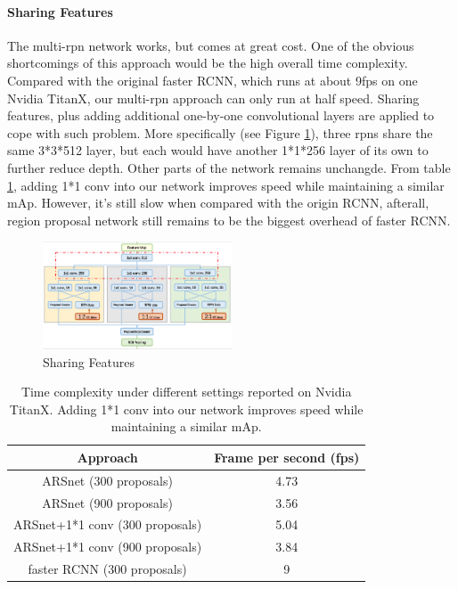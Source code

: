 \documentclass[10pt,twocolumn,letterpaper]{article}
\begin{document}
\paragraph{Sharing Features}
The multi-rpn network works, but comes at great cost. One of the obvious shortcomings of this approach would be the high overall time complexity. Compared with the original faster RCNN, which runs at about 9fps on one Nvidia TitanX, our multi-rpn approach can only run at half speed. Sharing features, plus adding additional one-by-one convolutional layers are applied to cope with such problem. More specifically (see Figure \ref{ARS_sh}), three rpns share the same 3*3*512 layer, but each would have another 1*1*256 layer of its own to further reduce depth. Other parts of the network remains unchangde. From table \ref{table_fps}, adding 1*1 conv into our network improves speed while maintaining a similar mAp. However, it's still slow when compared with the origin RCNN, afterall, region proposal network still remains to be the biggest overhead of faster RCNN.
    \begin{figure}[!htb]
    \includegraphics[width= 0.5\textwidth]{pic/ARS-archi-share.png}
    \caption{Sharing Features}
    \label{ARS_sh}
    \end{figure}

\begin{table}[ht]
\centering
\begin{tabular}{|c|c|}
\hline Approach & Frame per second (fps) \\
\hline ARSnet (300 proposals) & 4.73 \\
\hline ARSnet (900 proposals) & 3.56 \\
\hline ARSnet+1*1 conv (300 proposals) & 5.04 \\
\hline ARSnet+1*1 conv (900 proposals) & 3.84 \\
\hline faster RCNN (300 proposals) & 9 \\
\hline
\end{tabular}
\caption{Time complexity under different settings reported on Nvidia TitanX. Adding 1*1 conv into our network improves speed while maintaining a similar mAp.}
\label{table_fps}
\end{table}
\end{document}
